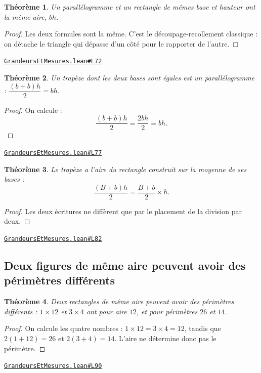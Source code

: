 \documentclass[11pt,a4paper]{article}
\theoremstyle{definition}
\theoremstyle{plain}
\newtheorem{theoreme}{Théorème}
\newcommand{\source}[2]{\par\smallskip\noindent\hfill{\footnotesize\href{#1}{\texttt{#2}}}\par\smallskip}
\begin{document}
\begin{theoreme}
Un parallélogramme et un rectangle de mêmes base et hauteur ont la même aire, $bh$.
\end{theoreme}

\begin{proof}
Les deux formules sont la même. C'est le découpage-recollement classique : on détache le
triangle qui dépasse d'un côté pour le rapporter de l'autre.
\end{proof}
\source{https://github.com/Commutator-IO/learn-lean/blob/main/cours/01-college/04-grandeurs-et-mesures/GrandeursEtMesures.lean\#L72}{GrandeursEtMesures.lean\#L72}

\begin{theoreme}
Un trapèze dont les deux bases sont égales est un parallélogramme :
$\dfrac{(b + b)h}{2} = bh$.
\end{theoreme}

\begin{proof}
On calcule :
\[ \frac{(b+b)h}{2} = \frac{2bh}{2} = bh . \]
\end{proof}
\source{https://github.com/Commutator-IO/learn-lean/blob/main/cours/01-college/04-grandeurs-et-mesures/GrandeursEtMesures.lean\#L77}{GrandeursEtMesures.lean\#L77}

\begin{theoreme}
Le trapèze a l'aire du rectangle construit sur la moyenne de ses bases :
\[ \frac{(B + b)h}{2} = \frac{B + b}{2} \times h . \]
\end{theoreme}

\begin{proof}
Les deux écritures ne diffèrent que par le placement de la division par deux.
\end{proof}
\source{https://github.com/Commutator-IO/learn-lean/blob/main/cours/01-college/04-grandeurs-et-mesures/GrandeursEtMesures.lean\#L82}{GrandeursEtMesures.lean\#L82}

\subsection{Deux figures de même aire peuvent avoir des périmètres différents}

\begin{theoreme}
Deux rectangles de même aire peuvent avoir des périmètres différents : $1 \times 12$ et
$3 \times 4$ ont pour aire $12$, et pour périmètres $26$ et $14$.
\end{theoreme}

\begin{proof}
On calcule les quatre nombres : $1 \times 12 = 3 \times 4 = 12$, tandis que
$2(1 + 12) = 26$ et $2(3 + 4) = 14$. L'aire ne détermine donc pas le périmètre.
\end{proof}
\source{https://github.com/Commutator-IO/learn-lean/blob/main/cours/01-college/04-grandeurs-et-mesures/GrandeursEtMesures.lean\#L90}{GrandeursEtMesures.lean\#L90}
\end{document}
